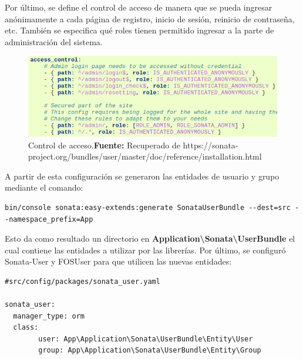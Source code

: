 \newpage
Por último, se define el control de acceso de manera que se pueda ingresar anónimamente a cada página de registro, inicio de sesión, reinicio de contraseña,
etc.
También se especifica qué roles tienen permitido ingresar a la parte de administración del sistema.

\begin{figure}[H]
    \includegraphics[width=1\linewidth]{image/acl.png}
    \caption[Control de acceso]{Control de acceso.\newline \textbf{Fuente:} Recuperado de https://sonata-project.org/bundles/user/master/doc/reference/installation.html}
    \label{fig:image/acl}
\end{figure}


A partir de esta configuración se generaron las entidades de usuario y grupo mediante el comando:

\begin{lstlisting}
bin/console sonata:easy-extends:generate SonataUserBundle --dest=src --namespace_prefix=App
\end{lstlisting}


Esto da como resultado un directorio en \textbf{Application\textbackslash Sonata\textbackslash UserBundle} el cual contiene las entidades a utilizar por las librerías.
Por último, se configuró Sonata-User y FOSUser para que utilicen las nuevas entidades:

\begin{lstlisting}[caption={Archivo de configuración de Sonata-User.\\Fuente: \sonatainstallation}]
#src/config/packages/sonata_user.yaml

sonata_user:
  manager_type: orm
  class:
        user: App\Application\Sonata\UserBundle\Entity\User
        group: App\Application\Sonata\UserBundle\Entity\Group

\end{lstlisting}

